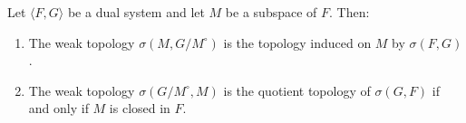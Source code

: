 Let $\langle F, G \rangle$ be a dual system and let $M$ be a subspace of $F$. Then:
\begin{enumerate}
\item The weak topology $\sigma(M, G/M^\circ)$ is the topology induced on $M$ by $\sigma(F, G)$.
\item The weak topology $\sigma(G/M^\circ, M)$ is the quotient topology of $\sigma(G, F)$ if and only if $M$ is closed in $F$.
\end{enumerate}
